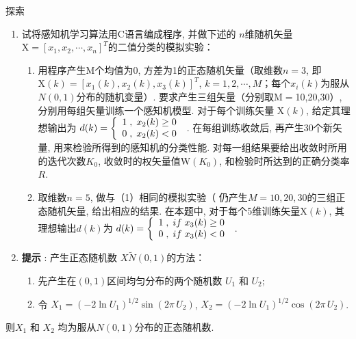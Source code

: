 \begin{custom}[explorecolor]{探索}
\begin{enumerate}
\item 试将感知机学习算法用C语言编成程序, 并做下述的 $n$维随机矢量$\mbox{X}=[x_{1} ,x_{2} ,\cdots ,x_{n} ]^{T}$的二值分类的模拟实验：
	\begin{enumerate}
	\item 用程序产生M个均值为0, 方差为1的正态随机矢量（取维数$n=3$, 即 $\mbox{X}(k)=[x_{1} (k),x_{2} (k),x_{3} (k)]^{T}$, $k=1,2,\cdots ,M$；每个$x_{i} (k)$为服从$N(0,1)$分布的随机变量）. 要求产生三组矢量（分别取M$=$10,20,30）, 分别用每组矢量训练一个感知机模型. 对于每个训练矢量 $\mbox{X}(k)$, 给定其理想输出为 $d(k)=\left\{ {{\begin{array}{*{20}c}
 {1\;,\;x_{2} (k)\ge 0} \hfill \\
 {0\;,\;x_{2} (k)<0} \hfill \\
\end{array} }} \right.$ . 在每组训练收敛后, 再产生30个新矢量, 用来检验所得到的感知机的分类性能. 对每一组结果要给出收敛时所用的迭代次数$K_{0}$, 收敛时的权矢量值$\mbox{W}(K_{0})$, 和检验时所达到的正确分类率$R$.
	\item 取维数$n=5$, 做与（1）相同的模拟实验（ 仍产生$M=10,20,30$的三组正态随机矢量, 给出相应的结果. 在本题中, 对于每个5维训练矢量$\mbox{X}(k)$, 其理想输出$d(k)$为 $d(k)=\left\{{{\begin{array}{*{20}c}
 {1\;,\;if\;x_{3} (k)\ge 0} \hfill \\
 {0\;,\;if\;x_{3} (k)<0} \hfill \\
\end{array} }} \right.$ .
	\end{enumerate}
\item[\textbullet] \textbf{提示 }: 产生正态随机数 $X\tilde N(0,1)$的方法：
	\begin{enumerate}
	\item 先产生在$(0, 1)$区间均匀分布的两个随机数 $U_{1}$ 和 $U_{2}$;
	\item 令 $X_{1} =(-2\ln U_{1} )^{1/2}\sin (2\pi \,U_{2} )$, $X_{2} =(-2\ln U_{1} )^{1/2}\cos (2\pi \,U_{2} )$.
	\end{enumerate}
\end{enumerate}
则$X_{1} $ 和 $X_{2} $ 均为服从$ N(0,1)$分布的正态随机数.
\end{custom}

